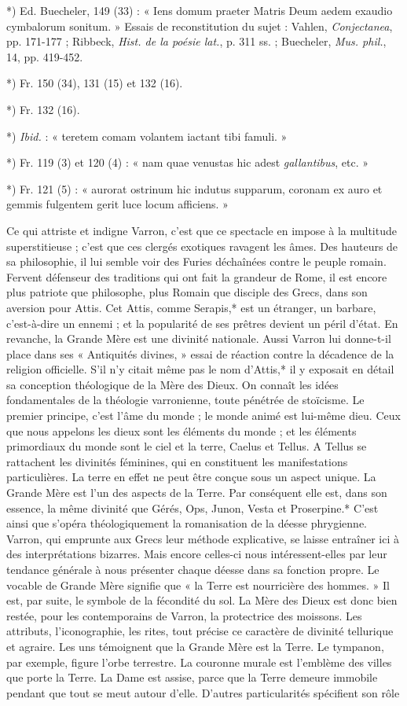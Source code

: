 \documentclass[a4paper, 11pt, oneside, polutonikogreek, french]{article}
\begin{document}
*) Ed. Buecheler, 149 (33) : « Iens domum praeter Matris Deum aedem exaudio cymbalorum sonitum. » Essais de reconstitution du sujet : Vahlen, \emph{Conjectanea}, pp. 171-177 ; Ribbeck, \emph{Hist. de la poésie lat.}, p. 311 ss. ; Buecheler, \emph{Mus. phil.}, 14, pp. 419-452.

*) Fr. 150 (34), 131 (15) et 132 (16).

*) Fr. 132 (16).

*) \emph{Ibid.} : « teretem comam volantem iactant tibi famuli. »

*) Fr. 119 (3) et 120 (4) : « nam quae venustas hic adest \emph{gallantibus}, etc. »

*) Fr. 121 (5) : « aurorat ostrinum hic indutus supparum, coronam ex auro et gemmis fulgentem gerit luce locum afficiens. »

Ce qui attriste et indigne Varron, c'est que ce spectacle en impose à la multitude superstitieuse ; c'est que ces clergés exotiques ravagent les âmes. Des hauteurs de sa philosophie, il lui semble voir des Furies déchaînées contre le peuple romain. Fervent défenseur des traditions qui ont fait la grandeur de Rome, il est encore plus patriote que philosophe, plus Romain que disciple des Grecs, dans son aversion pour Attis. Cet Attis, comme Serapis,* est un étranger, un barbare, c'est-à-dire un ennemi ; et la popularité de ses prêtres devient un péril d'état. En revanche, la Grande Mère est une divinité nationale. Aussi Varron lui donne-t-il place dans ses « Antiquités divines, » essai de réaction contre la décadence de la religion officielle. S'il n'y citait même pas le nom d'Attis,* il y exposait en détail sa conception théologique de la Mère des Dieux. On connaît les idées fondamentales de la théologie varronienne, toute pénétrée de stoïcisme. Le premier principe, c'est l'âme du monde ; le monde animé est lui-même dieu. Ceux que nous appelons les dieux sont les éléments du monde ; et les éléments primordiaux du monde sont le ciel et la terre, Caelus et Tellus. A Tellus se rattachent les divinités féminines, qui en constituent les manifestations particulières. La terre en effet ne peut être conçue sous un aspect unique. La Grande Mère est l'un des aspects de la Terre. Par conséquent elle est, dans son essence, la même divinité que Gérés, Ops, Junon, Vesta et Proserpine.* C'est ainsi que s'opéra théologiquement la romanisation de la déesse phrygienne. Varron, qui emprunte aux Grecs leur méthode explicative, se laisse entraîner ici à des interprétations bizarres. Mais encore celles-ci nous intéressent-elles par leur tendance générale à nous présenter chaque déesse dans sa fonction propre. Le vocable de Grande Mère signifie que « la Terre est nourricière des hommes. » Il est, par suite, le symbole de la fécondité du sol. La Mère des Dieux est donc bien restée, pour les contemporains de Varron, la protectrice des moissons. Les attributs, l'iconographie, les rites, tout précise ce caractère de divinité tellurique et agraire. Les uns témoignent que la Grande Mère est la Terre. Le tympanon, par exemple, figure l'orbe terrestre. La couronne murale est l'emblème des villes que porte la Terre. La Dame est assise, parce que la Terre demeure immobile pendant que tout se meut autour d'elle. D'autres particularités spécifient son rôle 
\end{document}
